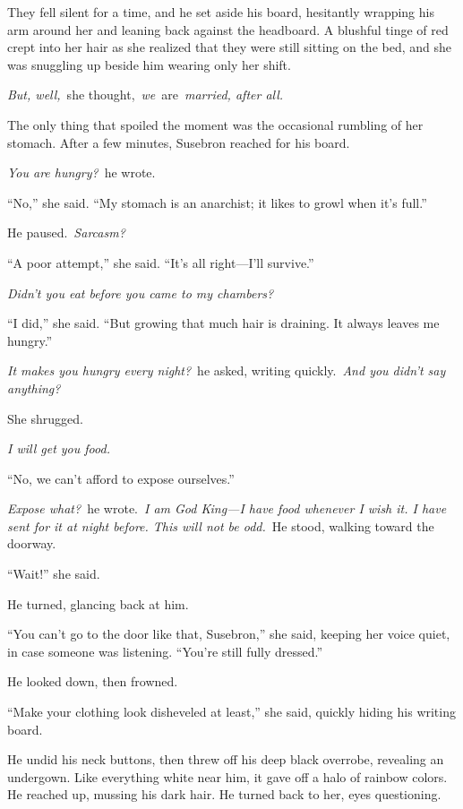 They fell silent for a time, and he set aside his board, hesitantly wrapping his arm around her and leaning back against the headboard. A blushful tinge of red crept into her hair as she realized that they were still sitting on the bed, and she was snuggling up beside him wearing only her shift.

\textit{But, well,}~she thought,~\textit{we}~are~\textit{married, after all.}

The only thing that spoiled the moment was the occasional rumbling of her stomach. After a few minutes, Susebron reached for his board.

\textit{You are hungry?}~he wrote.

“No,” she said. “My stomach is an anarchist; it likes to growl when it’s full.”

He paused.~\textit{Sarcasm?}

“A poor attempt,” she said. “It’s all right—I’ll survive.”

\textit{Didn’t you eat before you came to my chambers?}

“I did,” she said. “But growing that much hair is draining. It always leaves me hungry.”

\textit{It makes you hungry every night?}~he asked, writing quickly.~\textit{And you didn’t say anything?}

She shrugged.

\textit{I will get you food.}

“No, we can’t afford to expose ourselves.”

\textit{Expose what?}~he wrote.~\textit{I am God King—I have food whenever I wish it. I have sent for it at night before. This will not be odd.}~He stood, walking toward the doorway.

“Wait!” she said.

He turned, glancing back at him.

“You can’t go to the door like that, Susebron,” she said, keeping her voice quiet, in case someone was listening. “You’re still fully dressed.”

He looked down, then frowned.

“Make your clothing look disheveled at least,” she said, quickly hiding his writing board.

He undid his neck buttons, then threw off his deep black overrobe, revealing an undergown. Like everything white near him, it gave off a halo of rainbow colors. He reached up, mussing his dark hair. He turned back to her, eyes questioning.

